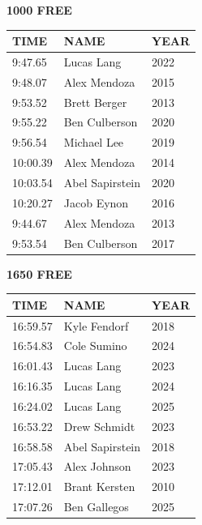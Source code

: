 \begin{table}[H]
\centering
\begin{minipage}[t]{0.48\textwidth}
\centering
\textbf{1000 FREE}\\[0.1cm]
\begin{tabular}{@{}p{1.8cm}p{2.8cm}p{1.2cm}@{}}
\hline
    \textbf{TIME} & \textbf{NAME} & \textbf{YEAR} \\
\hline
    9:47.65 & Lucas Lang & 2022 \\
    9:48.07 & Alex Mendoza & 2015 \\
    9:53.52 & Brett Berger & 2013 \\
    9:55.22 & Ben Culberson & 2020 \\
    9:56.54 & Michael Lee & 2019 \\
    10:00.39 & Alex Mendoza & 2014 \\
    10:03.54 & Abel Sapirstein & 2020 \\
    10:20.27 & Jacob Eynon & 2016 \\
    9:44.67 & Alex Mendoza & 2013 \\
    9:53.54 & Ben Culberson & 2017 \\
\hline
\end{tabular}
\end{minipage}\hfill
\begin{minipage}[t]{0.48\textwidth}
\centering
\textbf{1650 FREE}\\[0.1cm]
\begin{tabular}{@{}p{1.8cm}p{2.8cm}p{1.2cm}@{}}
\hline
    \textbf{TIME} & \textbf{NAME} & \textbf{YEAR} \\
\hline
    16:59.57 & Kyle Fendorf & 2018 \\
    16:54.83 & Cole Sumino & 2024 \\
    16:01.43 & Lucas Lang & 2023 \\
    16:16.35 & Lucas Lang & 2024 \\
    16:24.02 & Lucas Lang & 2025 \\
    16:53.22 & Drew Schmidt & 2023 \\
    16:58.58 & Abel Sapirstein & 2018 \\
    17:05.43 & Alex Johnson & 2023 \\
    17:12.01 & Brant Kersten & 2010 \\
    17:07.26 & Ben Gallegos & 2025 \\
\hline
\end{tabular}
\end{minipage}
\end{table}

